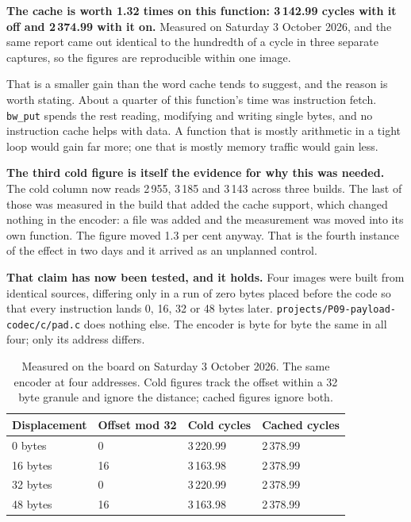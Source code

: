 \textbf{The cache is worth 1.32 times on this function: 3\,142.99 cycles with it
off and 2\,374.99 with it on.} Measured on Saturday 3 October 2026, and the same
report came out identical to the hundredth of a cycle in three separate captures,
so the figures are reproducible within one image.

That is a smaller gain than the word cache tends to suggest, and the reason is
worth stating. About a quarter of this function's time was instruction fetch.
\texttt{bw\_put} spends the rest reading, modifying and writing single bytes, and
no instruction cache helps with data. A function that is mostly arithmetic in a
tight loop would gain far more; one that is mostly memory traffic would gain less.

\textbf{The third cold figure is itself the evidence for why this was needed.} The
cold column now reads 2\,955, 3\,185 and 3\,143 across three builds. The last of
those was measured in the build that added the cache support, which changed nothing
in the encoder: a file was added and the measurement was moved into its own
function. The figure moved 1.3 per cent anyway. That is the fourth instance of the
effect in two days and it arrived as an unplanned control.

\textbf{That claim has now been tested, and it holds.} Four images were built
from identical sources, differing only in a run of zero bytes placed before the
code so that every instruction lands 0, 16, 32 or 48 bytes later.
\texttt{projects/P09-payload-codec/c/pad.c} does nothing else. The encoder is byte for byte the same in
all four; only its address differs.

\begin{table}[H]\centering\small
\begin{tabular}{p{22mm}p{26mm}p{26mm}p{26mm}}
\toprule
Displacement & Offset mod 32 & Cold cycles & Cached cycles \\
\midrule
0 bytes  &  0 & 3\,220.99 & 2\,378.99 \\
16 bytes & 16 & 3\,163.98 & 2\,378.99 \\
32 bytes &  0 & 3\,220.99 & 2\,378.99 \\
48 bytes & 16 & 3\,163.98 & 2\,378.99 \\
\bottomrule
\end{tabular}
\caption{Measured on the board on Saturday 3 October 2026. The same encoder at four addresses. Cold figures track the offset within a 32 byte granule and ignore the distance; cached figures ignore both.}
\end{table}

